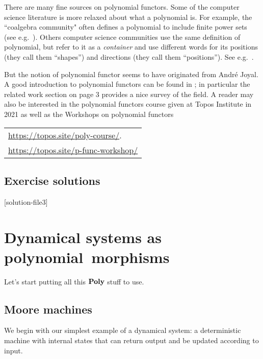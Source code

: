\documentclass[Book-Poly]{subfiles}
\begin{document}
There are many fine sources on polynomial functors. Some of the computer science literature is more relaxed about what a polynomial is. For example, the ``coalgebra community" often defines a polynomial to include finite power sets (see e.g.\ \cite{jacobs2017introduction}). Others computer science communities use the same definition of polynomial, but refer to it as a \emph{container} and use different words for its positions (they call them ``shapes'') and directions (they call them ``positions''). See e.g.\ \cite{abbot2003categoriesthesis,abbott2005containers}.

But the notion of polynomial functor seems to have originated from Andr\'{e} Joyal. A good introduction to polynomial functors can be found in \cite{kock2012polynomial}; in particular the related work section on page 3 provides a nice survey of the field. A reader may also be interested in the polynomial functors course given at Topos Institute in 2021 as well as the Workshops on polynomial functors\\
\begin{tabular}{l}
\url{https://topos.site/poly-course/}.
\\
\url{https://topos.site/p-func-workshop/}
\end{tabular}

\section{Exercise solutions}
{\footnotesize
}

[solution-file3]

\chapter{Dynamical systems as polynomial~morphisms} \label{ch.poly.dyn_sys}

Let's start putting all this $\mathbf{Poly}$ stuff to use. 

\section{Moore machines}\label{sec.poly.dyn_sys.moore}

We begin with our simplest example of a dynamical system: a deterministic machine with internal states that can return output and be updated according to input.
\end{document}
